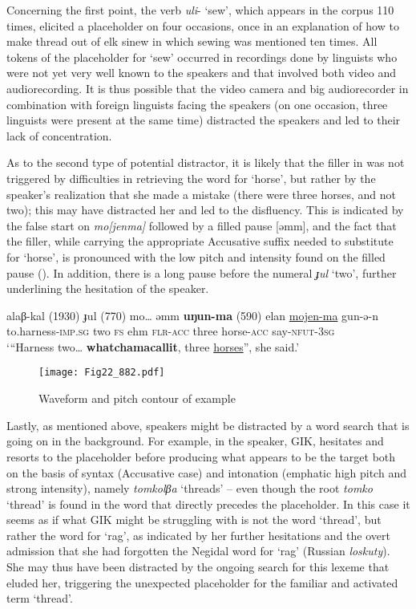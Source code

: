 \documentclass[output=paper]{langscibook}
\begin{document}
Concerning the first point, the verb \textit{uli}- ‘sew’, which appears in the corpus 110 times, elicited a placeholder on four occasions, once in an explanation of how to make thread out of elk sinew in which sewing was mentioned ten times. All tokens of the placeholder for ‘sew’ occurred in recordings done by linguists who were not yet very well known to the speakers and that involved both video and audiorecording. It is thus possible that the video camera and big audiorecorder in combination with foreign linguists facing the speakers (on one occasion, three linguists were present at the same time) distracted the speakers and led to their lack of concentration. 

As to the second type of potential distractor, it is likely that the filler in  was not triggered by difficulties in retrieving the word for ‘horse’, but rather by the speaker’s realization that she made a mistake (there were three horses, and not two); this may have distracted her and led to the disfluency. This is indicated by the false start on \textit{mo[jenma]} followed by a filled pause [əmm], and the fact that the filler, while carrying the appropriate Accusative suffix needed to substitute for ‘horse’, is pronounced with the low pitch and intensity found on the filled pause (). In addition, there is a long pause before the numeral \textit{ɟul} ‘two’, further underlining the hesitation of the speaker. 


\ea \label{ex:pakendorf:49}
\gll alaβ-kal
	\textup{(1930)}
	ɟul
	\textup{(770)}
	mo…
	əmm
	\textbf{uŋun-ma}
	\textup{(590)}
	elan
	\uline{mojen-ma}
	gun-ə-n\\
     to.harness-\textsc{imp.sg}
     {}
     two
     {}
     \textsc{fs}
     ehm
     \textsc{flr-acc}
     {}
     three
     horse-\textsc{acc}
     say-\textsc{nfut-3sg}\\
\glt ‘“Harness two… \textbf{whatchamacallit}, three \uline{horses}”, she said.’ 
\z

\begin{figure}
\texttt{[image: Fig22\_882.pdf]}
\caption{Waveform and pitch contour of example }
\label{fig:pakendorf:22}
\end{figure}

Lastly, as mentioned above, speakers might be distracted by a word search that is going on in the background. For example, in  the speaker, GIK, hesitates and resorts to the placeholder before producing what appears to be the target both on the basis of syntax (Accusative case) and intonation (emphatic high pitch and strong intensity), namely \textit{tomkolβa} ‘threads’ – even though the root \textit{tomko} ‘thread’ is found in the word that directly precedes the placeholder. In this case it seems as if what GIK might be struggling with is not the word ‘thread’, but rather the word for ‘rag’, as indicated by her further hesitations and the overt admission that she had forgotten the Negidal word for ‘rag’ (Russian \textit{loskuty}). She may thus have been distracted by the ongoing search for this lexeme that eluded her, triggering the unexpected placeholder for the familiar and activated term ‘thread’. 
\end{document}

